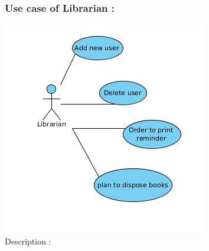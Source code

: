 \documentclass[a4paper]{article}
\begin{document}
\subsubsection*{Use case of Librarian :}
\includegraphics[scale=0.6]{images/librarianCaseDiag.png}\\
Description :
\\
\end{document}
